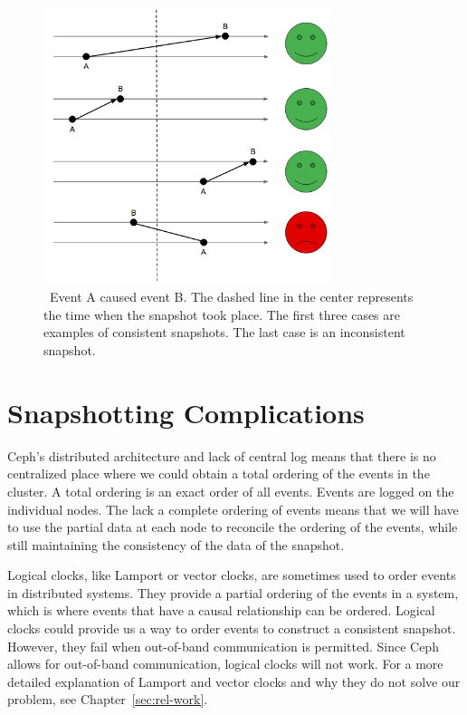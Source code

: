 \begin{figure}[!htbp]
  \centering
  \caption{~Event A caused event B. The dashed line in the center represents the time when the snapshot took place. The first three cases are examples of consistent snapshots. The last case is an inconsistent snapshot.} 
  \label{fig:consistency}
  \includegraphics[width=0.75\textwidth]{consistency.png}
\end{figure}

\section{Snapshotting Complications}

Ceph's distributed architecture and lack of central log means that
there is no centralized place where we could obtain a total ordering
of the events in the cluster. A total ordering is an exact order of
all events. Events are logged on the individual nodes. The lack a complete 
ordering of events means that we will have to use the partial data at each 
node to reconcile the ordering of the events, while still maintaining the 
consistency of the data of the snapshot.

Logical clocks, like Lamport or vector clocks, are sometimes used to
order events in distributed systems. They provide a partial ordering
of the events in a system, which is where events that have a causal
relationship can be ordered. Logical clocks could provide
us a way to order events to construct a consistent snapshot. However,
they fail when out-of-band communication is permitted. Since Ceph
allows for out-of-band communication, logical clocks will
not work. For a more detailed explanation of Lamport and vector clocks
and why they do not solve our problem, see Chapter~\ref{sec:rel-work}.


